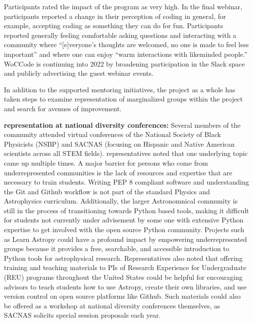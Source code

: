 \documentclass[modern]{aastex631}
\begin{document}
Participants rated the impact of the program as very high. In the
final webinar, participants reported a change in their perception of
coding in general, for example, accepting coding as something they can
do for fun. Participants reported generally feeling comfortable asking
questions and interacting with a community where ``[e]veryone's
thoughts are welcomed, no one is made to feel less important'' and
where one can enjoy ``warm interactions with likeminded people.''
WoCCode is continuing into 2022 by broadening participation in the
Slack space and publicly advertising the guest webinar events.

In addition to the supported mentoring initiatives, the \astropy
project as a whole has taken steps to examine representation of
marginalized groups within the project and search for avenues of
improvement.

\textbf{\astropy representation at national diversity conferences:}
Several members of the \astropy community attended virtual conferences
of the National Society of Black Physicists (NSBP) and SACNAS
(focusing on Hispanic and Native American scientists across all STEM
fields). \astropy representatives noted that one underlying topic came
up multiple times. A major barrier for persons who come from
underrepresented communities is the lack of resources and expertise
that are necessary to train students. Writing PEP 8 compliant software
and understanding the Git and Github workflow is not part of the
standard Physics and Astrophysics curriculum. Additionally, the larger
Astronomnical community is still in the process of transitioning
towards Python based tools, making it difficult for students not
currently under advisement by some one with extensive Python expertise
to get involved with the open source Python community. Projects such
as Learn Astropy could have a profound impact by empowering
underrepresented groups because it provides a free, searchable, and
accessible introduction to Python tools for astrophysical
research. Representatives also noted that offering training and
teaching materials to PIs of Research Experience for Undergraduate
(REU) programs throughout the United States could be helpful for
encouraging advisors to teach students how to use Astropy, create
their own libraries, and use version control on open source platforms
like Github. Such materials could also be offered as a workshop at
national diversity conferences themselves, as SACNAS solicits special
session proposals each year.
\end{document}

